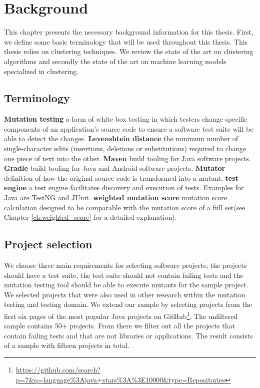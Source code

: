 \documentclass[../main]{subfiles}
\begin{document}
\chapter{Background}
\label{ch:background}
This chapter presents the necessary background information for this thesis. First, we define some basic terminology that will be used throughout this thesis.
This thesis relies on clustering techniques.
We review the state of the art on clustering algorithms and secondly the state of the art on machine learning models specialized in clustering.

\section{Terminology}
\textbf{Mutation testing}
a form of white box testing in which testers change specific components of an application's source code to ensure a software test suite will be able to detect the changes.
\textbf{Levenshtein distance} the minimum number of single-character edits (insertions, deletions or substitutions) required to change one piece of text into the other.
\textbf{Maven} build tooling for Java software projects.
\textbf{Gradle} build tooling for Java and Android software projects.
\textbf{Mutator} definition of how the original source code is transformed into a mutant.
\textbf{test engine} a test engine facilitates discovery and execution of tests. Examples for Java are TestNG and JUnit.
\textbf{weighted mutation score} mutation score calculation designed to be comparable with the mutation score of a full set(see Chapter \ref{ch:weighted_score} for a detailed explanation).

\section{Project selection}
\label{ch:project_selection}
We choose three main requirements for selecting software projects; the projects should have a test suite, the test suite should not contain failing tests and the mutation testing tool should be able to execute mutants for the sample project.
We selected projects that were also used in other research within the mutation testing and testing domain\cite{Pizzoleto2019,Yu2019PossibilityScope,Wei2021SpectralTesting, Zhang2019PredictiveTesting, Chen2018SpeedingStudy, Laurent2017AssessingPIT}.
\newline
We extend our sample by selecting projects from the first six pages of the most popular Java projects on GitHub\footnote{\url{https://github.com/search?p=7&q=language\%3Ajava+stars\%3A\%3E10000&type=Repositories}}.
The unfiltered sample contains 50+ projects.
From there we filter out all the projects that contain failing tests and that are not libraries or applications.
The result consists of a sample with fifteen projects in total.
\end{document}
